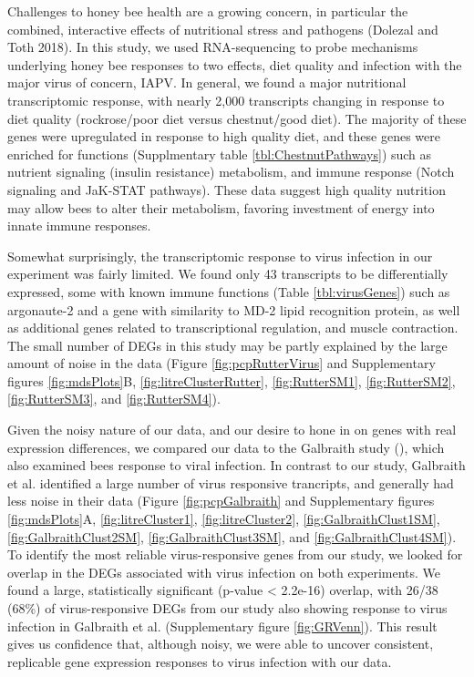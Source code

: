 \documentclass[11pt,a4paper,oldfontcommands,openany]{memoir}
\numberwithin{equation}{section} %
\begin{document}
Challenges to honey bee health are a growing concern, in particular the combined, interactive effects of nutritional stress and pathogens (Dolezal and Toth 2018). In this study, we used RNA-sequencing to probe mechanisms underlying honey bee responses to two effects, diet quality and infection with the major virus of concern, IAPV. In general, we found a major nutritional transcriptomic response, with nearly 2,000 transcripts changing in response to diet quality (rockrose/poor diet versus chestnut/good diet). The majority of these genes were upregulated in response to high quality diet, and these genes were enriched for functions (Supplmentary table \ref{tbl:ChestnutPathways}) such as nutrient signaling (insulin resistance) metabolism, and immune response (Notch signaling and JaK-STAT pathways). These data suggest high quality nutrition may allow bees to alter their metabolism, favoring investment of energy into innate immune responses.  

Somewhat surprisingly, the transcriptomic response to virus infection in our experiment was fairly limited. We found only 43 transcripts to be differentially expressed, some with known immune functions (Table \ref{tbl:virusGenes}) such as argonaute-2 and a gene with similarity to MD-2 lipid recognition protein, as well as additional genes related to transcriptional regulation, and muscle contraction. The small number of DEGs in this study may be partly explained by the large amount of noise in the data (Figure \ref{fig:pcpRutterVirus} and Supplementary figures \ref{fig:mdsPlots}B, \ref{fig:litreClusterRutter}, \ref{fig:RutterSM1}, \ref{fig:RutterSM2}, \ref{fig:RutterSM3}, and \ref{fig:RutterSM4}).

Given the noisy nature of our data, and our desire to hone in on genes with real expression differences, we compared our data to the Galbraith study (\citealt{galbraith}), which also examined bees response to viral infection. In contrast to our study, Galbraith et al. identified a large number of virus responsive trancripts, and generally had less noise in their data (Figure \ref{fig:pcpGalbraith} and Supplementary figures \ref{fig:mdsPlots}A, \ref{fig:litreCluster1}, \ref{fig:litreCluster2}, \ref{fig:GalbraithClust1SM}, \ref{fig:GalbraithClust2SM}, \ref{fig:GalbraithClust3SM}, and \ref{fig:GalbraithClust4SM}). To identify the most reliable virus-responsive genes from our study, we looked for overlap in the DEGs associated with virus infection on both experiments. We found a large, statistically significant (p-value < 2.2e-16) overlap, with 26/38 (68\%) of virus-responsive DEGs from our study also showing response to virus infection in Galbraith et al. (Supplementary figure \ref{fig:GRVenn}). This result gives us confidence that, although noisy, we were able to uncover consistent, replicable gene expression responses to virus infection with our data.  
\end{document}
